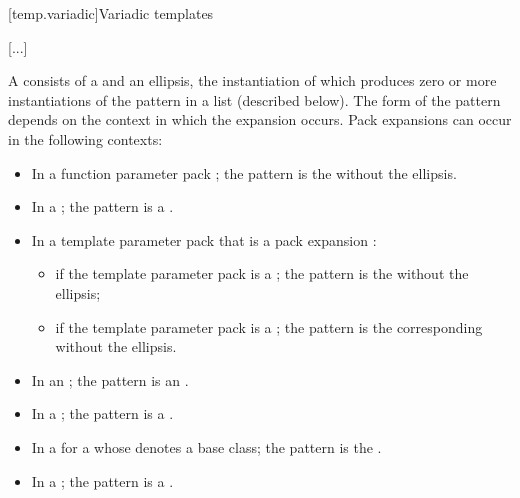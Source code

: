 \documentclass{wg21}
\begin{document}
[temp.variadic]{Variadic templates}

\textcolor{noteclr}{[...]}

\pnum
{}%
A 
consists of a  and an ellipsis, the instantiation of which
produces zero or more instantiations of the pattern in a list (described below).
The form of the pattern
depends on the context in which the expansion occurs. Pack
expansions can occur in the following contexts:

\begin{itemize}
    \item In a function parameter pack ; the pattern is the
     without the ellipsis.

    \item In a  ;
    the pattern is a .

    \item In a template parameter pack that is a pack expansion :
    \begin{itemize}
        \item
        if the template parameter pack is a ;
        the pattern is the  without the ellipsis;

        \item
        if the template parameter pack is a ;
        the pattern is the corresponding 
        without the ellipsis.
    \end{itemize}

    \item In an  ;
    the pattern is an .

    \item In a  ;
    the pattern is a .

    \item In a   for a
     whose  denotes a
    base class; the pattern is the .

    \item In a  ;
    the pattern is a .


\end{itemize}
\end{document}

